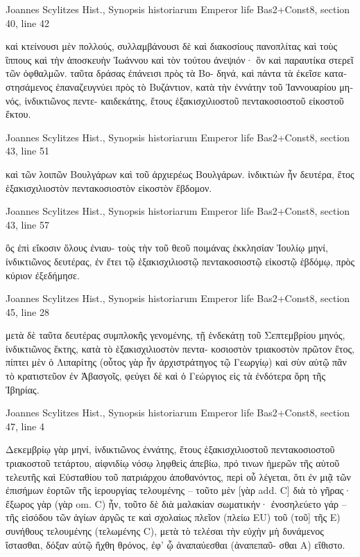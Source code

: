 \documentclass[12pt,letterpaper,twoside,final]{memoir}
\begin{document}
\begin{greek}
Joannes Scylitzes Hist., Synopsis historiarum 
Emperor life Bas2+Const8, section 40, line 42

                                                                           καὶ 
κτείνουσι μὲν πολλούς, συλλαμβάνουσι δὲ καὶ διακοσίους πανοπλίτας 
καὶ τοὺς ἵππους καὶ τὴν ἀποσκευὴν Ἰωάννου καὶ τὸν τούτου ἀνεψιόν· 
ὃν καὶ παραυτίκα στερεῖ τῶν ὀφθαλμῶν. ταῦτα δράσας ἐπάνεισι πρὸς τὰ Βο-
δηνά, καὶ πάντα τὰ ἐκεῖσε καταστησάμενος ἐπαναζευγνύει πρὸς τὸ 
Βυζάντιον, κατὰ τὴν ἐννάτην τοῦ Ἰαννουαρίου μηνός, ἰνδικτιῶνος πεντε-
καιδεκάτης, ἔτους ἑξακισχιλιοστοῦ πεντακοσιοστοῦ εἰκοστοῦ ἕκτου. 



Joannes Scylitzes Hist., Synopsis historiarum 
Emperor life Bas2+Const8, section 43, line 51

καὶ τῶν λοιπῶν Βουλγάρων καὶ τοῦ ἀρχιερέως Βουλγάρων. 
ἰνδικτιὼν ἦν δευτέρα, ἔτος ἑξακισχιλιοστὸν πεντακοσιοστὸν εἰκοστὸν 
ἕβδομον. 



Joannes Scylitzes Hist., Synopsis historiarum 
Emperor life Bas2+Const8, section 43, line 57

                                                     ὃς ἐπὶ εἴκοσιν ὅλους ἐνιαυ-
τοὺς τὴν τοῦ θεοῦ ποιμάνας ἐκκλησίαν Ἰουλίῳ μηνί, ἰνδικτιῶνος δευτέρας, 
ἐν ἔτει τῷ ἑξακισχιλιοστῷ πεντακοσιοστῷ εἰκοστῷ ἑβδόμῳ, πρὸς 
κύριον ἐξεδήμησε. 



Joannes Scylitzes Hist., Synopsis historiarum 
Emperor life Bas2+Const8, section 45, line 28

      μετὰ δὲ ταῦτα δευτέρας συμπλοκῆς γενομένης, τῇ ἑνδεκάτῃ τοῦ 
Σεπτεμβρίου μηνός, ἰνδικτιῶνος ἕκτης, κατὰ τὸ ἑξακισχιλιοστὸν πεντα-
κοσιοστὸν τριακοστὸν πρῶτον ἔτος, πίπτει μὲν ὁ Λιπαρίτης (οὗτος γὰρ 
ἦν ἀρχιστράτηγος τῷ Γεωργίῳ) καὶ σὺν αὐτῷ πᾶν τὸ κρατιστεῦον ἐν 
Ἀβασγοῖς, φεύγει δὲ καὶ ὁ Γεώργιος εἰς τὰ ἐνδότερα ὄρη τῆς Ἰβηρίας. 



Joannes Scylitzes Hist., Synopsis historiarum 
Emperor life Bas2+Const8, section 47, line 4

                                                          Δεκεμβρίῳ γὰρ μηνί, 
ἰνδικτιῶνος ἐννάτης, ἔτους ἑξακισχιλιοστοῦ πεντακοσιοστοῦ τριακοστοῦ 
τετάρτου, αἰφνιδίῳ νόσῳ ληφθεὶς ἀπεβίω, πρό τινων ἡμερῶν τῆς αὐτοῦ 
τελευτῆς καὶ Εὐσταθίου τοῦ πατριάρχου ἀποθανόντος, 
περὶ οὗ λέγεται, ὅτι ἐν μιᾷ τῶν ἐπισήμων ἑορτῶν τῆς ἱερουργίας τελουμένης – τοῦτο μὲν 
[γὰρ add. C] διὰ τὸ γῆρας· ἔξωρος γὰρ (γὰρ om. C) ἦν, τοῦτο δὲ διὰ μαλακίαν 
σωματικήν· ἐνοσηλεύετο γάρ – τῆς εἰσόδου τῶν ἁγίων ἀργῶς τε καὶ σχολαίως πλεῖον 
(πλείω EU) τοῦ (τοῦ] τῆς E) συνήθους τελουμένης (τελωμένης C), μετὰ τὸ τελέσαι τὴν 
εὐχὴν μὴ δυνάμενος ἵστασθαι, δόξαν αὐτῷ ἤχθη θρόνος, ἐφ' ᾧ ἀναπαύεσθαι (ἀναπεπαῦ-
σθαι A) εἴθιστο. 




\end{greek}
\end{document}
